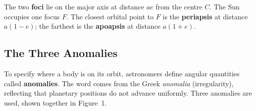 \documentclass[12pt]{article}
\begin{document}
The two \textbf{foci} lie on the major axis at distance $ae$ from the centre $C$.
The Sun occupies one focus $F$. The closest orbital point to $F$ is the
\textbf{periapsis} at distance $a(1-e)$; the farthest is the \textbf{apoapsis}
at distance $a(1+e)$.

\subsection{The Three Anomalies}

To specify where a body is on its orbit, astronomers define angular quantities called
\textbf{anomalies}. The word comes from the Greek \emph{anomalia} (irregularity),
reflecting that planetary positions do not advance uniformly. Three anomalies are
used, shown together in Figure~1.
\end{document}
